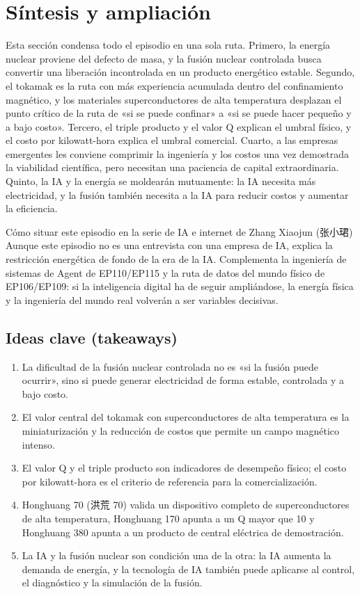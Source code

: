 \section{Síntesis y ampliación}

Esta sección condensa todo el episodio en una sola ruta. Primero, la energía nuclear proviene del defecto de masa, y la fusión nuclear controlada busca convertir una liberación incontrolada en un producto energético estable. Segundo, el tokamak es la ruta con más experiencia acumulada dentro del confinamiento magnético, y los materiales superconductores de alta temperatura desplazan el punto crítico de la ruta de «si se puede confinar» a «si se puede hacer pequeño y a bajo costo». Tercero, el triple producto y el valor Q explican el umbral físico, y el costo por kilowatt-hora explica el umbral comercial. Cuarto, a las empresas emergentes les conviene comprimir la ingeniería y los costos una vez demostrada la viabilidad científica, pero necesitan una paciencia de capital extraordinaria. Quinto, la IA y la energía se moldearán mutuamente: la IA necesita más electricidad, y la fusión también necesita a la IA para reducir costos y aumentar la eficiencia.

\begin{importantbox}{Cómo situar este episodio en la serie de IA e internet de Zhang Xiaojun (张小珺)}
Aunque este episodio no es una entrevista con una empresa de IA, explica la restricción energética de fondo de la era de la IA. Complementa la ingeniería de sistemas de Agent de EP110/EP115 y la ruta de datos del mundo físico de EP106/EP109: si la inteligencia digital ha de seguir ampliándose, la energía física y la ingeniería del mundo real volverán a ser variables decisivas.
\end{importantbox}

\subsection{Ideas clave (takeaways)}

\begin{enumerate}
\item La dificultad de la fusión nuclear controlada no es «si la fusión puede ocurrir», sino si puede generar electricidad de forma estable, controlada y a bajo costo.
\item El valor central del tokamak con superconductores de alta temperatura es la miniaturización y la reducción de costos que permite un campo magnético intenso.
\item El valor Q y el triple producto son indicadores de desempeño físico; el costo por kilowatt-hora es el criterio de referencia para la comercialización.
\item Honghuang 70 (洪荒 70) valida un dispositivo completo de superconductores de alta temperatura, Honghuang 170 apunta a un Q mayor que 10 y Honghuang 380 apunta a un producto de central eléctrica de demostración.
\item La IA y la fusión nuclear son condición una de la otra: la IA aumenta la demanda de energía, y la tecnología de IA también puede aplicarse al control, el diagnóstico y la simulación de la fusión.
\end{enumerate}

